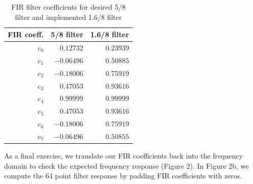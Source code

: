 \documentclass[11pt]{article}
\begin{document}
\begin{table}[t]
\centering
\caption{FIR filter coefficients for desired 5/8 filter and implemented 1.6/8
filter}
\begin{tabular}{@{}rrr@{}}
    \toprule
    FIR coeff. & 5/8 filter & 1.6/8 filter \\
    \midrule
    $c_0$ &  $0.12732$ & $0.23939$ \\
    $c_1$ & $-0.06496$ & $0.50885$ \\
    $c_2$ & $-0.18006$ & $0.75919$ \\
    $c_3$ &  $0.47053$ & $0.93616$ \\
    $c_4$ &  $0.99999$ & $0.99999$ \\
    $c_5$ &  $0.47053$ & $0.93616$ \\
    $c_6$ & $-0.18006$ & $0.75919$ \\
    $c_7$ & $-0.06496$ & $0.50855$ \\
    \bottomrule
\end{tabular}
\end{table}

As a final exercise, we translate our FIR coefficients back into the frequency
domain to check the expected frequency response (Figure 2).  In Figure 2b, we
compute the 64 point filter response by padding FIR coefficients with zeros.
\end{document}
